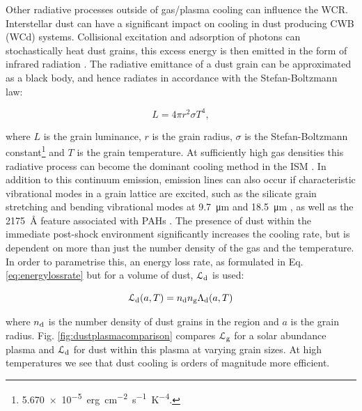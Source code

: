 Other radiative processes outside of gas/plasma cooling can influence the WCR.
Interstellar dust can have a significant impact on cooling in dust producing CWB (WCd) systems.
Collisional excitation and adsorption of photons can stochastically heat dust grains, this excess energy is then emitted in the form of infrared radiation \parencite{dwekCoolingSputteringInfrared1996}.
The radiative emittance of a dust grain can be approximated as a black body, and hence radiates in accordance with the Stefan-Boltzmann law:

\begin{equation}
  L = 4\pi r^2 \sigma T^4 , 
\end{equation}

\noindent
where $L$ is the grain luminance, $r$ is the grain radius, $\sigma$ is the Stefan-Boltzmann constant\footnote{\SI{5.670e-5}{erg.cm^{-2}.s^{-1}.K^{-4}}.} and $T$ is the grain temperature.
At sufficiently high gas densities this radiative process can become the dominant cooling method in the ISM \parencite{wolfireNeutralAtomicPhases1995}.
In addition to this continuum emission, emission lines can also occur if characteristic vibrational modes in a grain lattice are excited, such as the silicate grain stretching and bending vibrational modes at \SI{9.7}{\micro\metre} and \SI{18.5}{\micro\metre} \parencite[212]{whittetDustGalacticEnvironment2002}, as well as the \SI{2175}{\angstrom} feature associated with PAHs \parencite{draineInterstellarDustGrains2003}.
The presence of dust within the immediate post-shock environment significantly increases the cooling rate, but is dependent on more than just the number density of the gas and the temperature.
In order to parametrise this, an energy loss rate, as formulated in Eq. \ref{eq:energylossrate} but for a volume of dust, $\mathcal{L}_\text{d}$ is used:

\begin{equation}
  \mathcal{L}_\text{d} (a,T) = n_\text{d} n_\text{g} \Lambda_\text{d} (a,T)
\end{equation}

\noindent
where $n_\text{d}$ is the number density of dust grains in the region and $a$ is the grain radius.
Fig. \ref{fig:dustplasmacomparison} compares $\mathcal{L}_\text{g}$ for a solar abundance plasma and $\mathcal{L}_\text{d}$ for dust within this plasma at varying grain sizes.
At high temperatures we see that dust cooling is orders of magnitude more efficient.

